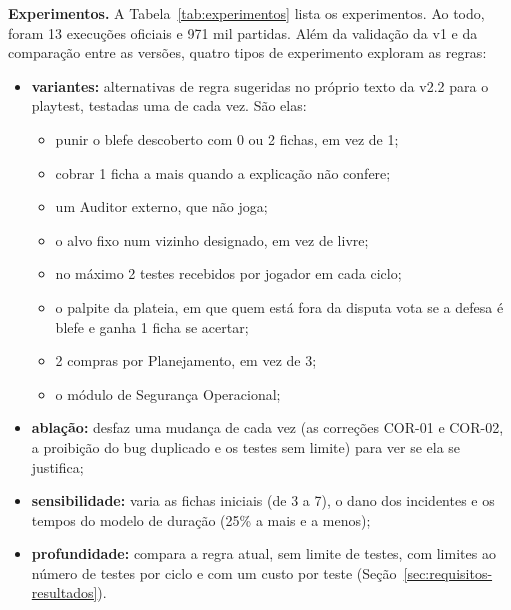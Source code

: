 \textbf{Experimentos.} A Tabela~\ref{tab:experimentos} lista os experimentos. Ao todo, foram 13 execuções oficiais
e 971 mil partidas. Além da validação da v1 e da comparação entre as versões, quatro tipos de experimento
exploram as regras:
\begin{itemize}
  \item \textbf{variantes:} alternativas de regra sugeridas no próprio texto da v2.2 para o playtest, testadas uma
    de cada vez. São elas:
    \begin{itemize}
      \item punir o blefe descoberto com 0 ou 2 fichas, em vez de 1;
      \item cobrar 1 ficha a mais quando a explicação não confere;
      \item um Auditor externo, que não joga;
      \item o alvo fixo num vizinho designado, em vez de livre;
      \item no máximo 2 testes recebidos por jogador em cada ciclo;
      \item o palpite da plateia, em que quem está fora da disputa vota se a defesa é blefe e ganha 1 ficha se
        acertar;
      \item 2 compras por Planejamento, em vez de 3;
      \item o módulo de Segurança Operacional;
    \end{itemize}
  \item \textbf{ablação:} desfaz uma mudança de cada vez (as correções COR-01 e COR-02, a proibição do bug
    duplicado e os testes sem limite) para ver se ela se justifica;
  \item \textbf{sensibilidade:} varia as fichas iniciais (de 3 a 7), o dano dos incidentes e os tempos do modelo
    de duração (25\% a mais e a menos);
  \item \textbf{profundidade:} compara a regra atual, sem limite de testes, com limites ao número de testes por
    ciclo e com um custo por teste (Seção~\ref{sec:requisitos-resultados}).
\end{itemize}

